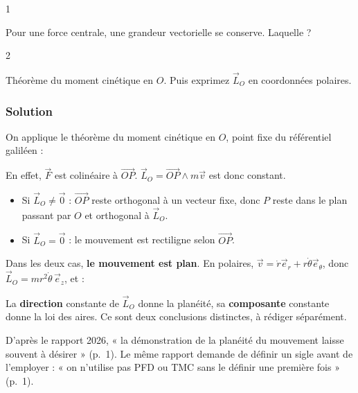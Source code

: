 \documentclass[11pt,a4paper]{article}
\providecommand{\tightlist}{\setlength{\itemsep}{0pt}\setlength{\parskip}{0pt}}
\newcommand{\equationajustee}[1]{%
  \sbox{\boiteequation}{$\displaystyle #1$}%
  \ifdim\wd\boiteequation>\linewidth
    \[\resizebox{\linewidth}{!}{\usebox{\boiteequation}}\]%
  \else
    \[#1\]%
  \fi}
\begin{document}
\begin{indication}{1}

Pour une force centrale, une grandeur vectorielle se conserve. Laquelle ?

\end{indication}

\begin{indication}{2}

Théorème du moment cinétique en \(O\). Puis exprimez \(\vec L_O\) en coordonnées polaires.

\end{indication}

\hypertarget{solution-3}{%
\subsubsection{Solution}\label{solution-3}}

On applique le théorème du moment cinétique en \(O\), point fixe du référentiel galiléen :

\equationajustee{\frac{\mathrm d\vec L_O}{\mathrm dt}=\overrightarrow{OP}\wedge\vec F=\vec 0}

En effet, \(\vec F\) est colinéaire à \(\overrightarrow{OP}\). \(\vec L_O=\overrightarrow{OP}\wedge m\vec v\) est donc constant.

\begin{itemize}
\tightlist
\item
  Si \(\vec L_O\ne\vec 0\) : \(\overrightarrow{OP}\) reste orthogonal à un vecteur fixe, donc \(P\) reste dans le plan passant par \(O\) et orthogonal à \(\vec L_O\).
\item
  Si \(\vec L_O=\vec 0\) : le mouvement est rectiligne selon \(\overrightarrow{OP}\).
\end{itemize}

Dans les deux cas, \textbf{le mouvement est plan}. En polaires, \(\vec v=\dot r\vec e_r+r\dot\theta\vec e_\theta\), donc \(\vec L_O=mr^2\dot\theta\,\vec e_z\), et :

\equationajustee{\boxed{r^2\dot\theta=C=\text{cste}}}

\begin{methode}

La \textbf{direction} constante de \(\vec L_O\) donne la planéité, sa \textbf{composante} constante donne la loi des aires. Ce sont deux conclusions distinctes, à rédiger séparément.

\end{methode}

\begin{jury}

D'après le rapport 2026, « la démonstration de la planéité du mouvement laisse souvent à désirer » (p.~1). Le même rapport demande de définir un sigle avant de l'employer : « on n'utilise pas PFD ou TMC sans le définir une première fois » (p.~1).

\end{jury}
\end{document}
